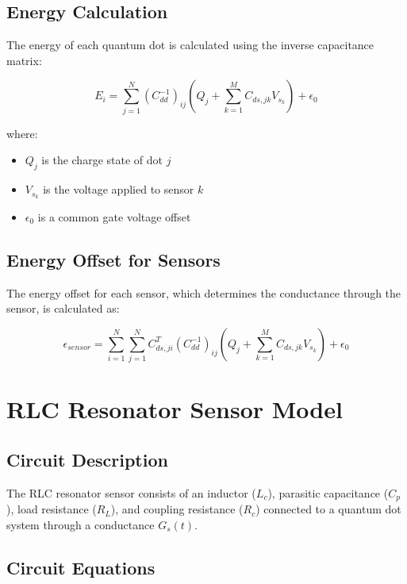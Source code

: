 \documentclass{article}
\begin{document}
\subsection{Energy Calculation}

The energy of each quantum dot is calculated using the inverse capacitance matrix:

\begin{equation}
E_i = \sum_{j=1}^{N} (C_{dd}^{-1})_{ij} \left( Q_j + \sum_{k=1}^{M} C_{ds,jk} V_{s_k} \right) + \epsilon_0
\end{equation}

where:
\begin{itemize}
\item $Q_j$ is the charge state of dot $j$
\item $V_{s_k}$ is the voltage applied to sensor $k$
\item $\epsilon_0$ is a common gate voltage offset
\end{itemize}

\subsection{Energy Offset for Sensors}

The energy offset for each sensor, which determines the conductance through the sensor, is calculated as:

\begin{equation}
\epsilon_{sensor} = \sum_{i=1}^{N} \sum_{j=1}^{N} C_{ds,ji}^T (C_{dd}^{-1})_{ij} \left( Q_j + \sum_{k=1}^{M} C_{ds,jk} V_{s_k} \right) + \epsilon_0
\end{equation}

\section{RLC Resonator Sensor Model}

\subsection{Circuit Description}

The RLC resonator sensor consists of an inductor ($L_c$), parasitic capacitance ($C_p$), load resistance ($R_L$), and coupling resistance ($R_c$) connected to a quantum dot system through a conductance $G_s(t)$.

\subsection{Circuit Equations}
\end{document}
